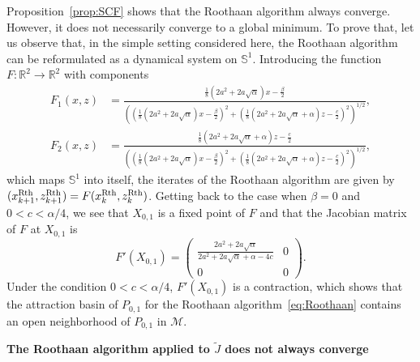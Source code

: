 \documentclass{article}
\def\R{\mathbb R}
\newcommand{\1}{{\mathds 1}}
\begin{document}
\noindent
Proposition~\ref{prop:SCF} shows that the Roothaan algorithm always converge. However, it does not necessarily converge to a global minimum. To prove that, let us observe that, in the simple setting considered here, the Roothaan algorithm can be reformulated as a dynamical system on $\mathbb S^1$. Introducing the function $F: \R^2 \to \R^2$ with components
\begin{align*}
F_1(x,z) &= \frac{\frac{1}{8}(2a^2+2a\sqrt\alpha) x-\frac\beta 2}{\left( \left( \frac{1}{8}(2a^2+2a\sqrt\alpha) x-\frac\beta 2\right)^2 + \left( \frac{1}{8}(2a^2+2a\sqrt\alpha+\alpha) z-\frac c 2\right)^2 \right)^{1/2}}, \\
F_2(x,z) &= \frac{\frac{1}{8}(2a^2+2a\sqrt\alpha+\alpha) z-\frac c 2}{\left( \left( \frac{1}{8}(2a^2+2a\sqrt\alpha) x-\frac\beta 2\right)^2 + \left( \frac{1}{8}(2a^2+2a\sqrt\alpha+\alpha) z-\frac c 2\right)^2 \right)^{1/2}},
\end{align*}
which maps $\mathbb S^1$ into itself, the iterates of the Roothaan algorithm are given by $(x_{k+1}^{\rm Rth},z_{k+1}^{\rm Rth})=F(x_{k}^{\rm Rth},z_{k}^{\rm Rth})$. Getting back to the case when $\beta=0$ and $0 < c < \alpha/4$, we see that $X_{0,1}$ is a fixed point of $F$ and that the Jacobian matrix of $F$ at $X_{0,1}$ is
$$
F'(X_{0,1})= \begin{pmatrix} \frac{2a^2+2a\sqrt \alpha}{2a^2+2a\sqrt\alpha+\alpha-4c} & 0 \\ 0 & 0 \end{pmatrix}.
$$
Under the condition $0 < c < \alpha/4$, $F'(X_{0,1})$ is a contraction, which shows that the attraction basin of $P_{0,1}$ for the Roothaan algorithm~\eqref{eq:Roothaan} contains an open neighborhood of $P_{0,1}$ in $\mathcal M$.

\medskip

\noindent
{\bf The Roothaan algorithm applied to $\widetilde J$ does not always converge}

\medskip
\end{document}
